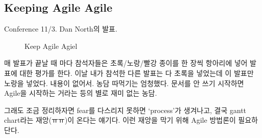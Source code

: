 \documentclass[11pt]{article}
\begin{document}
%  
%  
 
\subsection{Keeping Agile Agile}

Conference 11/3. Dan North의 발표. 

\begin{figure}[t]
    \begin{Frame}
        \begin{center}
        \end{center}
    \end{Frame}
    \caption{Keep Agile Agiel}
    \label{agile agile}
\end{figure}

매 발표가 끝날 때 마다 참석자들은 초록/노랑/빨강 종이를 한 장씩 항아리에 넣어
발표에 대한 평가를 한다. 이날 내가 참석한 다른 발표는 다 초록을
넣었는데 이 발표만 노랑을 넣었다. 내용이 없어서. 농담 따먹기는 엄청했다. 
문서를 안 쓰기 시작하면 Agile을 시작하는 거라는 등의 별로 재미 없는 농담.

그래도 조금 정리하자면 fear를 다스리지 못하면 `process'가 생겨나고, 
결국 gantt chart라는 재앙(ㅠㅠ)이 온다는 얘기다. 이런 재앙을 막기 위해 Agile 
방법론이 필요하단다.
\end{document}
